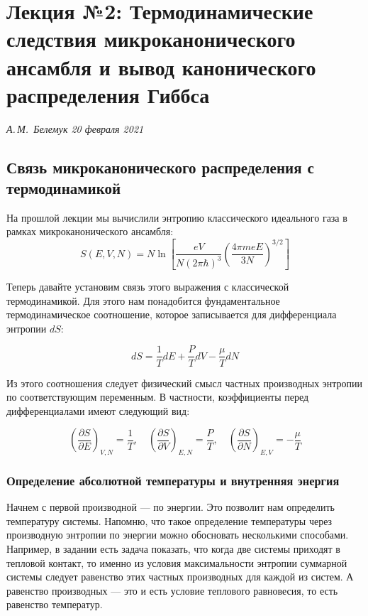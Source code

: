 \documentclass[../general/general]{subfiles}
\begin{document}
\chapter{Лекция №2: Термодинамические следствия микроканонического ансамбля и вывод канонического распределения Гиббса}
\noindent\textit{А.\,М.~Белемук \hfill 20 февраля 2021}
\vspace{1em}
\ifSubfilesClassLoaded{\tableofcontents\newpage}{}

\section{Связь микроканонического распределения с термодинамикой}

На прошлой лекции мы вычислили энтропию классического идеального газа в рамках микроканонического ансамбля:
\begin{equation}
S(E, V, N) = N \ln \left[ \frac{eV}{N(2\pi\hbar)^3} \left( \frac{4\pi m e E}{3N} \right)^{3/2} \right]
\end{equation}

Теперь давайте установим связь этого выражения с классической термодинамикой. Для этого нам понадобится фундаментальное термодинамическое соотношение, которое записывается для дифференциала энтропии $dS$:

\begin{equation}
dS = \frac{1}{T} dE + \frac{P}{T} dV - \frac{\mu}{T} dN
\end{equation}

Из этого соотношения следует физический смысл частных производных энтропии по соответствующим переменным. В частности, коэффициенты перед дифференциалами имеют следующий вид:

\begin{equation}
\left( \frac{\partial S}{\partial E} \right)_{V, N} = \frac{1}{T}, \quad \left( \frac{\partial S}{\partial V} \right)_{E, N} = \frac{P}{T}, \quad \left( \frac{\partial S}{\partial N} \right)_{E, V} = -\frac{\mu}{T}
\end{equation}

\subsection{Определение абсолютной температуры и внутренняя энергия}

Начнем с первой производной — по энергии. Это позволит нам определить температуру системы. Напомню, что такое определение температуры через производную энтропии по энергии можно обосновать несколькими способами. Например, в задании есть задача показать, что когда две системы приходят в тепловой контакт, то именно из условия максимальности энтропии суммарной системы следует равенство этих частных производных для каждой из систем. А равенство производных — это и есть условие теплового равновесия, то есть равенство температур.
\end{document}
